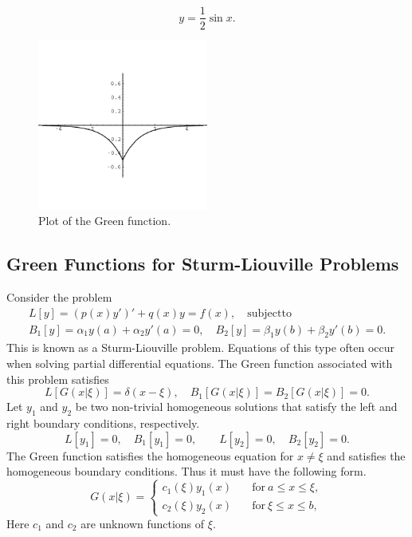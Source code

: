 \begin{Example}
\begin{align*}
  \end{align*}
  \[ 
  \boxed{ 
    y = \frac{1}{2} \sin x. 
    } 
  \]
  \begin{figure}[tb!]
    \begin{center}
      \includegraphics[width=0.5\textwidth]{ode/inhomogeneous/greens1}
    \end{center}
    \caption{Plot of the Green function.} 
    \label{greens_ex}
  \end{figure}

\end{Example}






\subsection{Green Functions for Sturm-Liouville Problems}



Consider the problem
\begin{gather*}
  L[y] = \left( p(x) y' \right)' + q(x) y = f(x), 
  \quad \mathrm{subject to}
  \\
  B_1[y] = \alpha_1 y(a) + \alpha_2 y'(a) = 0, \quad
  B_2[y] = \beta_1 y(b) + \beta_2 y'(b) = 0. 
\end{gather*}
This is known as a Sturm-Liouville problem.  Equations of this type
often occur when solving partial differential equations.
The Green function associated with this problem satisfies
\[ 
L[G(x|\xi)] = \delta(x-\xi), \quad B_1[G(x|\xi)] = B_2[G(x|\xi)] = 0.
\]
Let $y_1$ and $y_2$ be two non-trivial homogeneous solutions that satisfy
the left and right boundary conditions, respectively.
\[ 
L[y_1] = 0, \quad B_1[y_1] = 0, \qquad L[y_2] = 0, \quad B_2[y_2] = 0. 
\]
The Green function satisfies the homogeneous equation for $x \neq \xi$ 
and satisfies the homogeneous boundary conditions.
Thus it must have the following form.
\[ 
G(x|\xi) = 
\begin{cases}
  c_1(\xi) y_1(x) \quad &\mathrm{for}\ a \leq x \leq \xi, \\
  c_2(\xi) y_2(x) \quad &\mathrm{for}\ \xi \leq x \leq b,
\end{cases}
\]
Here $c_1$ and $c_2$ are unknown functions of $\xi$.

